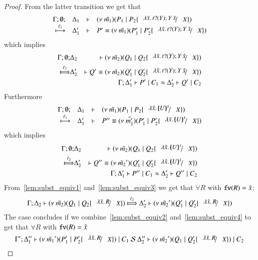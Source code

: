 \begin{proof}
	\noi From the latter transition we get that
%
\[
		\mhorel{\Gamma}{\Delta_1}{\newsp{\tilde{m_1}}{P_1 \Par P_2 \subst{\abs{\tilde{x}}{\binp{t}{Y} \appl{Y}{\tilde{x}}}}{X}}}
		{\hby{\ell_1}}{\Delta_1'}{P' \scong}{\newsp{\tilde{m_1}}{P_1' \Par P_2' \subst{\abs{\tilde{x}}{\binp{t}{Y} \appl{Y}{\tilde{x}}}}{X}}}
\]
%
	\noi which implies
%
	\begin{eqnarray}
		\Gamma; \es; &\Delta_2& \proves \newsp{\tilde{m_2}}{Q_1 \Par Q_2 \subst{\abs{\tilde{x}}{\binp{t}{Y} \appl{Y}{\tilde{x}}}}{X}} \nonumber \\
		\Hby{\ell_2}&
		\Delta_2'& \proves Q' \scong \newsp{\tilde{m_2}}{Q_1' \Par Q_2' \subst{\abs{\tilde{x}}{\binp{t}{Y} \appl{Y}{\tilde{x}}}}{X}}
		\label{lem:subst_equiv1}
		\\
		&&\horel{\Gamma}{\Delta_1'}{P' \Par C_1}{\wb}{\Delta_2'}{Q' \Par C_2} \label{lem:subst_equiv2}
	\end{eqnarray}
%
	\noi Furthermore
%
\[
	\mhorel{\Gamma}{\Delta_1}{\newsp{\tilde{m_1}}{P_1 \Par P_2 \subst{\abs{\tilde{x}}{\mapchar{U}{\tilde{x}}}}{X}}}{\hby{\ell_1}}
	{\Delta_1'}{P'' \scong}{\newsp{\tilde{m_1'}}{P_1' \Par P_2' \subst{\abs{\tilde{x}}{\mapchar{U}{\tilde{x}}}}{X}}}
\]
%
	\noi which implies
%
	\begin{eqnarray}
		\Gamma; \es; &\Delta_2& \proves \newsp{\tilde{m_2}}{Q_1 \Par Q_2 \subst{\abs{\tilde{x}}{\mapchar{U}{\tilde{x}}}}{X}} \nonumber \\
		\Hby{\ell_2} &\Delta_2'& \proves  Q'' \scong \newsp{\tilde{m_2}'}{Q_1' \Par Q_2' \subst{\abs{\tilde{x}}{\mapchar{U}{\tilde{x}}}}{X}}
		\label{lem:subst_equiv3}
		\\
		&&\horel{\Gamma}{\Delta_1'}{P'' \Par C_1}{\wb}{\Delta_2'}{Q'' \Par C_2} \label{lem:subst_equiv4}
	\end{eqnarray}
%
	\noi From~\ref{lem:subst_equiv1} and~\ref{lem:subst_equiv3} we get that $\forall R$ with $\mathtt{fv}(R) = \tilde{x}$:
%
	\[
		\horel{\Gamma}{\Delta_2}{\newsp{\tilde{m_2}}{Q_1 \Par Q_2 \subst{\abs{\tilde{x}}{R}}{X}}}
		{\Hby{\ell_2}}
		{\Delta_2'}{\newsp{\tilde{m_2}'}{Q_1' \Par Q_2' \subst{\abs{\tilde{x}}{R}}{X}}}
	\]
%
	\noi The case concludes if we combine~\ref{lem:subst_equiv2} and~\ref{lem:subst_equiv4} to get that $\forall R$ with $\mathtt{fv}(R) = \tilde{x}$
%
	\[
		\horel{\Gamma'}{\Delta_1''}{\newsp{\tilde{m_1}'}{P_1' \Par P_2' \subst{\abs{\tilde{x}}{R}}{X}} \Par C_1}
		{\ \mathcal{S}\ }
		{\Delta_2''}{\newsp{\tilde{m_2}'}{Q_1 \Par Q_2' \subst{\abs{\tilde{x}}{R}}{X}} \Par C_2}
	\]



\end{proof}
